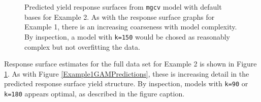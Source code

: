 \documentclass[phdcss]{SDSUThesis}
\begin{document}
    



\begin{figure}\centering
\caption{Predicted yield response surfaces from \texttt{mgcv} model with default bases for Example 2. As with the response surface graphs for Example 1, there is an increasing coarseness with model complexity. By inspection, a model with \texttt{k=150} would be chosed as reasonably complex but not overfitting the data.}
\label{Example2FullGAMPredictions}
\end{figure}

Response surface estimates for the full data set for Example 2 is shown in Figure \ref{Example2FullGAMPredictions}. As with Figure \ref{Example1GAMPredictions}, these is increasing detail in the predicted response surface yield structure. By inspection, models with \texttt{k=90} or \texttt{k=180} appears optimal, as described in the figure caption.
\end{document}

